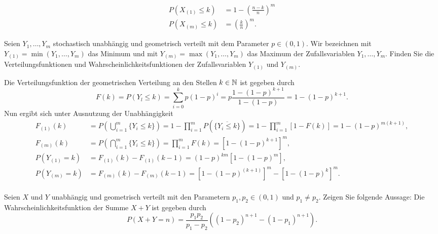 \solution
\begin{align*}
    P\left( X_{(1)} \leq k \right) &= 1 - \left( \frac{n-k}{n} \right)^m \\
    P\left( X_{(m)} \leq k \right) &= \left( \frac{k}{n} \right)^{m}. 
\end{align*}


 Seien $Y_1,\dots ,Y_m$
stochastisch unabhängig und geometrisch verteilt mit dem Parameter $p\in(0,1)$.
Wir bezeichnen mit $Y_{(1)} = \min (Y_1,\dots ,Y_m)$ das Minimum und mit
$Y_{(m)} = \max \left( Y_1,\dots ,Y_m \right)$ das Maximum der Zufallsvariablen
$Y_1,\dots ,Y_m$.  Finden Sie die Verteilungsfunktionen und Wahrscheinlichkeitsfunktionen der
Zufallsvariablen $Y_{(1)}$ und $Y_{(m)}$.

\solution
Die Verteilungsfunktion der geometrischen Verteilung an den Stellen $k\in\mathbb{N}$ ist gegeben durch
\begin{equation*}
  F(k) = P(Y_l \le k) = \sum_{i=0}^{k} p(1-p)^i = p\frac{1-(1-p)^{k+1}}{1-(1-p)} = 1-(1-p)^{k+1}.
\end{equation*}
Nun ergibt sich unter Ausnutzung der Unabhängigkeit
\begin{align*}
    F_{(1)}(k)
    &= P\left(\bigcup_{i=1}^m \{Y_i \le k\}\right)
    = 1 - \prod_{i=1}^m P\left(\overline{\{Y_i \le k\}}\right)
    = 1 - \prod_{i=1}^m \left[1-F(k)\right]
    = 1 - \left( 1-p \right)^{m(k+1)}, \\
    F_{(m)}(k) 
    &= P\left(\bigcap_{i=1}^m \{Y_i \le k\}\right)
    = \prod_{i=1}^m F(k)
    = \left[1-(1-p)^{k+1}\right]^m, \\
    P\left( Y_{(1)} = k \right)
    &= F_{(1)}(k) - F_{(1)}(k-1) 
    = (1-p)^{km}\left[1-(1-p)^m\right], \\
    P\left( Y_{(m)} = k \right)
    &=  F_{(m)}(k) - F_{(m)}(k-1)
    = \left[ 1-(1-p)^{(k+1)} \right]^m - \left[ 1-(1-p)^{k} \right]^m. \\
\end{align*}


 Seien $X$ und $Y$ unabhängig und geometrisch
verteilt mit den Parametern $p_1, p_2 \in (0,1)$ und $p_1\neq p_2$. Zeigen Sie folgende Aussage: 
Die Wahrscheinlichkeitsfunktion der Summe $X+Y$ ist gegeben durch
\begin{equation*}
    P(X+Y = n ) = \frac{p_1 p_2}{p_1 - p_2} \left( (1-p_2)^{n+1}- (1-p_1)^{n+1} \right).  
\end{equation*}

